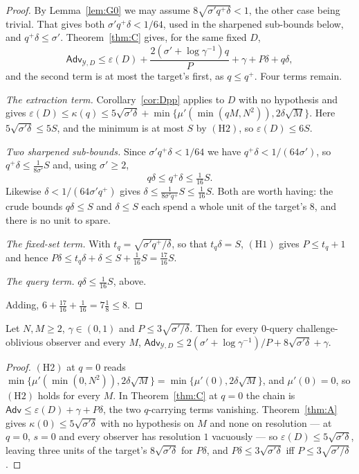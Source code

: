 \documentclass{aicr-solution}
\newcommand{\Adv}{\mathsf{Adv}}
\begin{document}
\begin{proof}
By Lemma~\ref{lem:G0} we may assume $8\sqrt{\sigma' q^{+}\delta} < 1$, the other
case being trivial. That gives both $\sigma' q^{+}\delta < 1/64$, used in the
sharpened sub-bounds below, and $q^{+}\delta \le \sigma'$. Theorem~\ref{thm:C}
gives, for the same fixed $D$,
\[
  \Adv_{\mathcal{Y},D} \le \varepsilon(D)
  + \frac{2(\sigma' + \log\gamma^{-1})q}{P} + \gamma + P\delta + q\delta,
\]
and the second term is at most the target's first, as $q \le q^{+}$. Four terms
remain.

\emph{The extraction term.} Corollary~\ref{cor:Dpp} applies to $D$ with no
hypothesis and gives
$\varepsilon(D) \le \kappa(q) \le 5\sqrt{\sigma'\delta}
+ \min\{\mu'(\min(qM,N^{2})), 2\delta\sqrt{M}\}$. Here
$5\sqrt{\sigma'\delta} \le 5S$, and the minimum is at most $S$ by
$(\mathrm{H2})$, so $\varepsilon(D) \le 6S$.

\emph{Two sharpened sub-bounds.} Since $\sigma' q^{+}\delta < 1/64$ we have
$q^{+}\delta < 1/(64\sigma')$, so $q^{+}\delta \le \frac{1}{8\sigma'}S$ and, using
$\sigma' \ge 2$,
\[
  q\delta \le q^{+}\delta \le \tfrac{1}{16}S .
\]
Likewise $\delta < 1/(64\sigma' q^{+})$ gives
$\delta \le \frac{1}{8\sigma' q^{+}}S \le \frac{1}{16}S$. Both are worth having:
the crude bounds $q\delta \le S$ and $\delta \le S$ each spend a whole unit of the
target's $8$, and there is no unit to spare.

\emph{The fixed-set term.} With $t_q = \sqrt{\sigma' q^{+}/\delta}$, so that
$t_q\delta = S$, $(\mathrm{H1})$ gives $P \le t_q + 1$ and hence
$P\delta \le t_q\delta + \delta \le S + \frac{1}{16}S = \frac{17}{16}S$.

\emph{The query term.} $q\delta \le \frac{1}{16}S$, above.

Adding, $6 + \frac{17}{16} + \frac{1}{16} = 7\frac18 \le 8$.
\end{proof}

\begin{corollary}[at $q = 0$ there is no restriction on $M$]\label{cor:G2}
Let $N,M \ge 2$, $\gamma \in (0,1)$ and $P \le 3\sqrt{\sigma'/\delta}$. Then for
every $0$-query challenge-oblivious observer and every $M$,
$\Adv_{\mathcal{Y},D} \le 2(\sigma' + \log\gamma^{-1})/P + 8\sqrt{\sigma'\delta}
+ \gamma$.
\end{corollary}

\begin{proof}
$(\mathrm{H2})$ at $q = 0$ reads
$\min\{\mu'(\min(0,N^{2})), 2\delta\sqrt{M}\} = \min\{\mu'(0), 2\delta\sqrt{M}\}$,
and $\mu'(0) = 0$, so $(\mathrm{H2})$ holds for every $M$. In Theorem~\ref{thm:C}
at $q = 0$ the chain is $\Adv \le \varepsilon(D) + \gamma + P\delta$, the two
$q$-carrying terms vanishing. Theorem~\ref{thm:A} gives
$\kappa(0) \le 5\sqrt{\sigma'\delta}$ with no hypothesis on $M$ and none on
resolution --- at $q = 0$, $s = 0$ and every observer has resolution $1$ vacuously
--- so $\varepsilon(D) \le 5\sqrt{\sigma'\delta}$, leaving three units of the
target's $8\sqrt{\sigma'\delta}$ for $P\delta$, and
$P\delta \le 3\sqrt{\sigma'\delta}$ iff $P \le 3\sqrt{\sigma'/\delta}$.
\end{proof}
\end{document}
